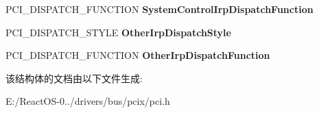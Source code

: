 \begin{DoxyCompactItemize}
\item 
\mbox{\label{struct___p_c_i___m_j___d_i_s_p_a_t_c_h___t_a_b_l_e_a16d64f1bfee8d794be9ec9fb76513fea}} 
P\+C\+I\+\_\+\+D\+I\+S\+P\+A\+T\+C\+H\+\_\+\+F\+U\+N\+C\+T\+I\+ON {\bfseries System\+Control\+Irp\+Dispatch\+Function}
\item 
\mbox{\label{struct___p_c_i___m_j___d_i_s_p_a_t_c_h___t_a_b_l_e_a47536a7743723d619e91c614e15627f7}} 
P\+C\+I\+\_\+\+D\+I\+S\+P\+A\+T\+C\+H\+\_\+\+S\+T\+Y\+LE {\bfseries Other\+Irp\+Dispatch\+Style}
\item 
\mbox{\label{struct___p_c_i___m_j___d_i_s_p_a_t_c_h___t_a_b_l_e_ab4757dfde2ec8a9bb2fc1b050475de98}} 
P\+C\+I\+\_\+\+D\+I\+S\+P\+A\+T\+C\+H\+\_\+\+F\+U\+N\+C\+T\+I\+ON {\bfseries Other\+Irp\+Dispatch\+Function}
\end{DoxyCompactItemize}


该结构体的文档由以下文件生成\+:\begin{DoxyCompactItemize}
\item 
E\+:/\+React\+O\+S-\/0../drivers/bus/pcix/pci.\+h\end{DoxyCompactItemize}
